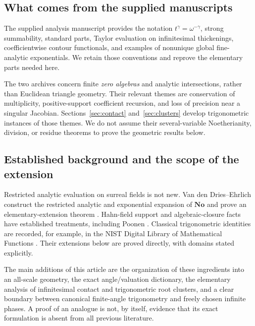 \documentclass[11pt]{article}
\numberwithin{equation}{section}
\theoremstyle{definition}
\newcommand{\No}{\mathbf{No}}
\begin{document}
\subsection{What comes from the supplied manuscripts}
The supplied analysis manuscript \cite{SourceAnalysis} provides the notation $t^\gamma=\omega^{-\gamma}$, strong summability, standard parts, Taylor evaluation on infinitesimal thickenings, coefficientwise contour functionals, and examples of nonunique global fine-analytic exponentials. We retain those conventions and reprove the elementary parts needed here.

The two archives \cite{SourceFinite,SourceIntersections} concern finite \emph{zero algebras} and analytic intersections, rather than Euclidean triangle geometry. Their relevant themes are conservation of multiplicity, positive-support coefficient recursion, and loss of precision near a singular Jacobian. Sections~\ref{sec:contact} and~\ref{sec:clusters} develop trigonometric instances of those themes. We do not assume their several-variable Noetherianity, division, or residue theorems to prove the geometric results below.

\subsection{Established background and the scope of the extension}
Restricted analytic evaluation on surreal fields is not new. Van den Dries--Ehrlich construct the restricted analytic and exponential expansion of $\No$ and prove an elementary-extension theorem \cite[Theorem 2.1]{vdDE}. Hahn-field support and algebraic-closure facts have established treatments, including Poonen \cite{Poonen}. Classical trigonometric identities are recorded, for example, in the NIST Digital Library of Mathematical Functions \cite{DLMF}. Their extensions below are proved directly, with domains stated explicitly.

The main additions of this article are the organization of these ingredients into an all-scale geometry, the exact angle/valuation dictionary, the elementary analysis of infinitesimal contact and trigonometric root clusters, and a clear boundary between canonical finite-angle trigonometry and freely chosen infinite phases. A proof of an analogue is not, by itself, evidence that its exact formulation is absent from all previous literature.
\end{document}

